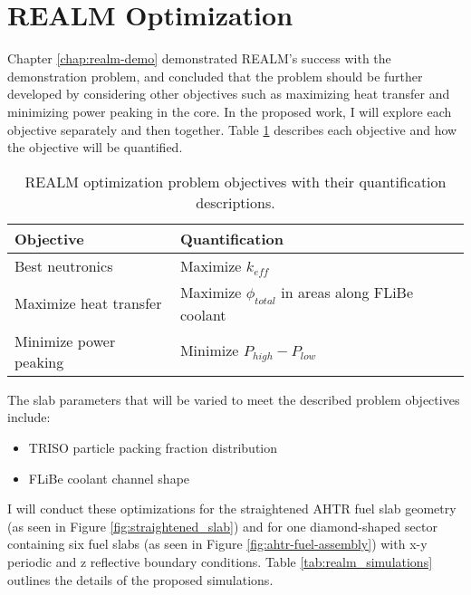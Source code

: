 \section{REALM Optimization}
Chapter \ref{chap:realm-demo} demonstrated \gls{REALM}'s success with the
demonstration problem, and concluded that the problem should be further
developed by considering other objectives such as maximizing heat transfer and 
minimizing power peaking in the core. 
In the proposed work, I will explore each objective separately and then together.
Table \ref{tab:objectives} describes each objective and how the objective will 
be quantified. 
\begin{table}[]
    \centering
    \onehalfspacing
    \caption{\acrfull{REALM} optimization problem objectives with their quantification 
    descriptions.}
	\label{tab:objectives}
    \footnotesize
    \begin{tabular}{p{4cm}p{8cm}}
    \hline 
    \textbf{Objective}& \textbf{Quantification}  \\
    \hline
    Best neutronics & Maximize $k_{eff}$\\ 
    Maximize heat transfer & Maximize $\phi_{total}$ in areas along FLiBe coolant \\
    Minimize power peaking & Minimize $P_{high}-P_{low}$ \\
    \hline
    \end{tabular}
\end{table}
The slab parameters that will be varied to meet the described problem objectives 
include: 
\begin{itemize}
    \item \gls{TRISO} particle packing fraction distribution
    \item \gls{FLiBe} coolant channel shape 
\end{itemize} 
I will conduct these optimizations for the straightened \gls{AHTR} fuel slab 
geometry (as seen in Figure \ref{fig:straightened_slab}) and for one 
diamond-shaped sector containing six fuel slabs (as seen in Figure 
\ref{fig:ahtr-fuel-assembly}) with x-y periodic and z reflective boundary 
conditions. 
Table \ref{tab:realm_simulations} outlines the details of the proposed 
simulations. 
